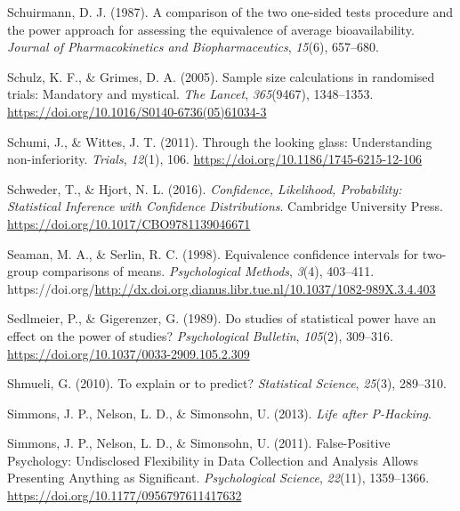 \documentclass[
  oneside]{krantz}
\newlength{\cslhangindent}
\newlength{\cslentryspacingunit} %
\newenvironment{CSLReferences}[2] %
 {%
  \setlength{\parindent}{0pt}
  \ifodd #1
  \let\oldpar\par
  \def\par{\hangindent=\cslhangindent\oldpar}
  \fi
  \setlength{\parskip}{#2\cslentryspacingunit}
 }%
 {}
\begin{document}
\begin{CSLReferences}{1}{0}
\leavevmode{}%
Schuirmann, D. J. (1987). A comparison of the two one-sided tests
procedure and the power approach for assessing the equivalence of
average bioavailability. \emph{Journal of Pharmacokinetics and
Biopharmaceutics}, \emph{15}(6), 657--680.

\leavevmode{}%
Schulz, K. F., \& Grimes, D. A. (2005). Sample size calculations in
randomised trials: Mandatory and mystical. \emph{The Lancet},
\emph{365}(9467), 1348--1353.
\url{https://doi.org/10.1016/S0140-6736(05)61034-3}

\leavevmode{}%
Schumi, J., \& Wittes, J. T. (2011). Through the looking glass:
Understanding non-inferiority. \emph{Trials}, \emph{12}(1), 106.
\url{https://doi.org/10.1186/1745-6215-12-106}

\leavevmode{}%
Schweder, T., \& Hjort, N. L. (2016). \emph{Confidence, {Likelihood},
{Probability}: {Statistical Inference} with {Confidence Distributions}}.
{Cambridge University Press}.
\url{https://doi.org/10.1017/CBO9781139046671}

\leavevmode{}%
Seaman, M. A., \& Serlin, R. C. (1998). Equivalence confidence intervals
for two-group comparisons of means. \emph{Psychological Methods},
\emph{3}(4), 403--411.
https://doi.org/\url{http://dx.doi.org.dianus.libr.tue.nl/10.1037/1082-989X.3.4.403}

\leavevmode{}%
Sedlmeier, P., \& Gigerenzer, G. (1989). Do studies of statistical power
have an effect on the power of studies? \emph{Psychological Bulletin},
\emph{105}(2), 309--316.
\url{https://doi.org/10.1037/0033-2909.105.2.309}

\leavevmode{}%
Shmueli, G. (2010). To explain or to predict? \emph{Statistical
Science}, \emph{25}(3), 289--310.

\leavevmode{}%
Simmons, J. P., Nelson, L. D., \& Simonsohn, U. (2013). \emph{Life after
{P-Hacking}}.

\leavevmode{}%
Simmons, J. P., Nelson, L. D., \& Simonsohn, U. (2011). False-{Positive
Psychology}: {Undisclosed Flexibility} in {Data Collection} and
{Analysis Allows Presenting Anything} as {Significant}.
\emph{Psychological Science}, \emph{22}(11), 1359--1366.
\url{https://doi.org/10.1177/0956797611417632}


\end{CSLReferences}
\end{document}
